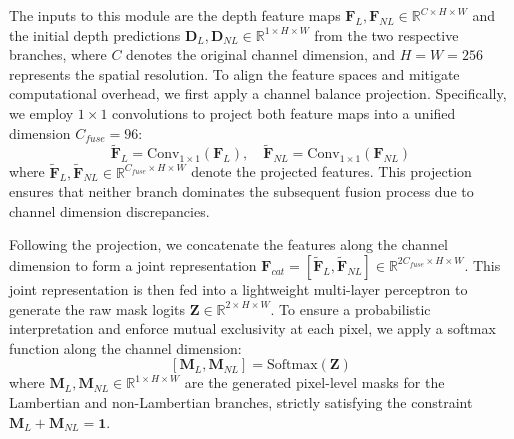 \documentclass[lettersize,journal]{IEEEtran}
\begin{document}
The inputs to this module are the depth feature maps $\mathbf{F}_L, \mathbf{F}_{NL} \in \mathbb{R}^{C \times H \times W}$ and the initial depth predictions $\mathbf{D}_L, \mathbf{D}_{NL} \in \mathbb{R}^{1 \times H \times W}$ from the two respective branches, where $C$ denotes the original channel dimension, and $H=W=256$ represents the spatial resolution. To align the feature spaces and mitigate computational overhead, we first apply a channel balance projection. Specifically, we employ $1 \times 1$ convolutions to project both feature maps into a unified dimension $C_{fuse} = 96$:
\begin{equation}
\label{eq:eq17}
\tilde{\mathbf{F}}_L = \text{Conv}_{1\times1}(\mathbf{F}_L), \quad \tilde{\mathbf{F}}_{NL} = \text{Conv}_{1\times1}(\mathbf{F}_{NL})
\end{equation}
where $\tilde{\mathbf{F}}_L, \tilde{\mathbf{F}}_{NL} \in \mathbb{R}^{C_{fuse} \times H \times W}$ denote the projected features. This projection ensures that neither branch dominates the subsequent fusion process due to channel dimension discrepancies.

Following the projection, we concatenate the features along the channel dimension to form a joint representation $\mathbf{F}_{cat} = [\tilde{\mathbf{F}}_L, \tilde{\mathbf{F}}_{NL}] \in \mathbb{R}^{2C_{fuse} \times H \times W}$. This joint representation is then fed into a lightweight multi-layer perceptron to generate the raw mask logits $\mathbf{Z} \in \mathbb{R}^{2 \times H \times W}$. To ensure a probabilistic interpretation and enforce mutual exclusivity at each pixel, we apply a softmax function along the channel dimension:
\begin{equation}
\label{eq:eq18}
[\mathbf{M}_L, \mathbf{M}_{NL}] = \text{Softmax}(\mathbf{Z})
\end{equation}
where $\mathbf{M}_L, \mathbf{M}_{NL} \in \mathbb{R}^{1 \times H \times W}$ are the generated pixel-level masks for the Lambertian and non-Lambertian branches, strictly satisfying the constraint $\mathbf{M}_L + \mathbf{M}_{NL} = \mathbf{1}$.
\end{document}
